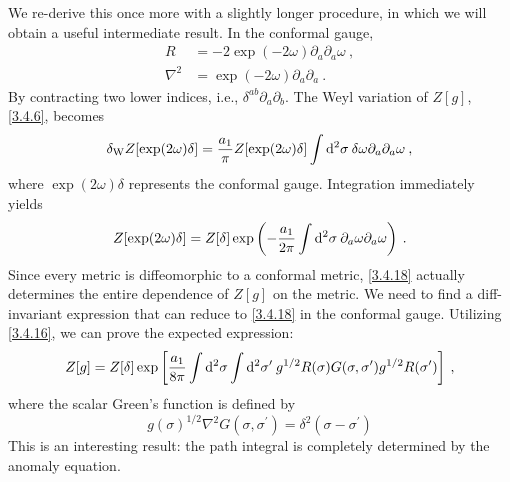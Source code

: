 We re-derive this once more with a slightly longer procedure, in which we will obtain a useful intermediate result.    
In the conformal gauge,    
\begin{subequations}\label{3.4.16}
	\begin{align}
		R&=-2 \exp (-2 \omega) \partial_{a} \partial_{a} \omega \:,\label{3.4.16a}\\
		\nabla^{2}&=\exp (-2 \omega) \partial_{a} \partial_{a} \:. \label{3.4.16b}
	\end{align}
\end{subequations}
By contracting two lower indices, i.e., $\delta^{a b} \partial_{a} \partial_{b}$.    
The Weyl variation of $Z[g]$, \eqref{3.4.6}, becomes    
\begin{equation}
	\delta_{\mathrm{W}} Z[\exp (2 \omega) \delta]=\frac{a_{1}}{\pi} Z[\exp (2 \omega) \delta] \int \mathrm{d}^{2} \sigma\: \delta \omega \partial_{a} \partial_{a} \omega \:, \label{3.4.17}
\end{equation}
where $\exp (2 \omega) \delta$ represents the conformal gauge.    
Integration immediately yields    
\begin{equation}\label{3.4.18}
	Z[\exp (2 \omega) \delta]=Z[\delta] \exp \left(-\frac{a_{1}}{2 \pi} \int \mathrm{d}^{2} \sigma \: \partial_{a} \omega \partial_{a} \omega\right) \:.
\end{equation}
Since every metric is diffeomorphic to a conformal metric, \eqref{3.4.18} actually determines the entire dependence of $Z[g]$ on the metric. We need to find a diff-invariant expression that can reduce to \eqref{3.4.18} in the conformal gauge.    
Utilizing \eqref{3.4.16}, we can prove the expected expression:    
\begin{equation}\label{3.4.19}
	Z[g]=Z[\delta] \exp \left[\frac{a_{1}}{8 \pi} \int \mathrm{d}^{2} \sigma \int \mathrm{d}^{2} \sigma^{\prime} \: g^{1 / 2} R(\sigma) G(\sigma, \sigma^{\prime}) g^{1 / 2} R(\sigma^{\prime})\right] \:,
\end{equation}
where the scalar Green's function is defined by    
\begin{equation}
	g(\sigma)^{1 / 2} \nabla^{2} G(\sigma, \sigma^{\prime})=\delta^{2}(\sigma-\sigma^{\prime}) \label{3.4.20}
\end{equation}
This is an interesting result: the path integral is completely determined by the anomaly equation.    
